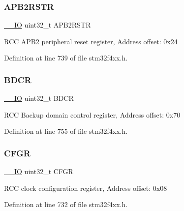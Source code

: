 \subsubsection{\texorpdfstring{A\+P\+B2\+R\+S\+TR}{APB2RSTR}}
{\footnotesize\ttfamily \hyperlink{group___c_m_s_i_s__core__definitions_gaec43007d9998a0a0e01faede4133d6be}{\+\_\+\+\_\+\+IO} uint32\+\_\+t A\+P\+B2\+R\+S\+TR}

R\+CC A\+P\+B2 peripheral reset register, Address offset\+: 0x24 

Definition at line 739 of file stm32f4xx.\+h.

\mbox{\label{struct_r_c_c___type_def_a0b9a3ced775287c8585a6a61af4b40e9}} 
\subsubsection{\texorpdfstring{B\+D\+CR}{BDCR}}
{\footnotesize\ttfamily \hyperlink{group___c_m_s_i_s__core__definitions_gaec43007d9998a0a0e01faede4133d6be}{\+\_\+\+\_\+\+IO} uint32\+\_\+t B\+D\+CR}

R\+CC Backup domain control register, Address offset\+: 0x70 

Definition at line 755 of file stm32f4xx.\+h.

\mbox{\label{struct_r_c_c___type_def_a26f1e746ccbf9c9f67e7c60e61085ec1}} 
\subsubsection{\texorpdfstring{C\+F\+GR}{CFGR}}
{\footnotesize\ttfamily \hyperlink{group___c_m_s_i_s__core__definitions_gaec43007d9998a0a0e01faede4133d6be}{\+\_\+\+\_\+\+IO} uint32\+\_\+t C\+F\+GR}

R\+CC clock configuration register, Address offset\+: 0x08 

Definition at line 732 of file stm32f4xx.\+h.

\mbox{\label{struct_r_c_c___type_def_a907d8154c80b7e385478943f90b17a3b}} 
